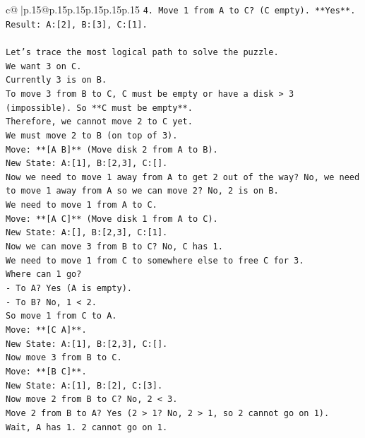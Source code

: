 \documentclass{article}
\begin{document}
{\begin{supertabular}{c@{$\;$}|p{.15\linewidth}@{}p{.15\linewidth}p{.15\linewidth}p{.15\linewidth}p{.15\linewidth}p{.15\linewidth}}
{{{\texttt{4. Move 1 from A to C? (C empty). **Yes**. Result: A:{[}2{]}, B:{[}3{]}, C:{[}1{]}.} \\
\\ 
\texttt{Let's trace the most logical path to solve the puzzle.} \\
\texttt{We want 3 on C.} \\
\texttt{Currently 3 is on B.} \\
\texttt{To move 3 from B to C, C must be empty or have a disk > 3 (impossible). So **C must be empty**.} \\
\texttt{Therefore, we cannot move 2 to C yet.} \\
\texttt{We must move 2 to B (on top of 3).} \\
\texttt{Move: **{[}A B{]}** (Move disk 2 from A to B).} \\
\texttt{New State: A:{[}1{]}, B:{[}2,3{]}, C:{[}{]}.} \\
\texttt{Now we need to move 1 away from A to get 2 out of the way? No, we need to move 1 away from A so we can move 2? No, 2 is on B.} \\
\texttt{We need to move 1 from A to C.} \\
\texttt{Move: **{[}A C{]}** (Move disk 1 from A to C).} \\
\texttt{New State: A:{[}{]}, B:{[}2,3{]}, C:{[}1{]}.} \\
\texttt{Now we can move 3 from B to C? No, C has 1.} \\
\texttt{We need to move 1 from C to somewhere else to free C for 3.} \\
\texttt{Where can 1 go?} \\
\texttt{{-} To A? Yes (A is empty).} \\
\texttt{{-} To B? No, 1 < 2.} \\
\texttt{So move 1 from C to A.} \\
\texttt{Move: **{[}C A{]}**.} \\
\texttt{New State: A:{[}1{]}, B:{[}2,3{]}, C:{[}{]}.} \\
\texttt{Now move 3 from B to C.} \\
\texttt{Move: **{[}B C{]}**.} \\
\texttt{New State: A:{[}1{]}, B:{[}2{]}, C:{[}3{]}.} \\
\texttt{Now move 2 from B to C? No, 2 < 3.} \\
\texttt{Move 2 from B to A? Yes (2 > 1? No, 2 > 1, so 2 cannot go on 1).} \\
\texttt{Wait, A has 1. 2 cannot go on 1.} \\
}}}
\end{supertabular}}
\end{document}
